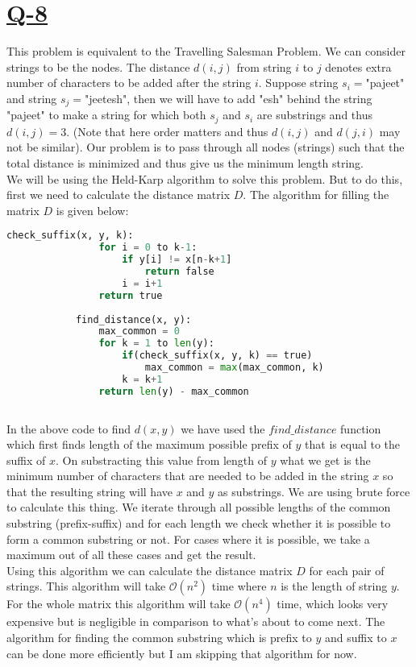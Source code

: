 \documentclass[14pt]{article}
\begin{document}
	\section*{\underline{Q-8}}
		\noindent
		This problem is equivalent to the Travelling Salesman Problem. We can consider strings to be the nodes. The distance $d(i, j)$ from string $i$ to $j$ denotes extra number of characters to be added after the string $i$. Suppose string $s_i = $"pajeet" and string $s_j = $"jeetesh", then we will have to add "esh" behind the string "pajeet" to make a string for which both $s_j$ and $s_i$ are substrings and thus $d(i, j) = 3$. (Note that here order matters and thus $d(i, j)$ and $d(j, i)$ may not be similar). Our problem is to pass through all nodes (strings) such that the total distance is minimized and thus give us the minimum length string.\\
		\newline
		We will be using the Held-Karp algorithm to solve this problem. But to do this, first we need to calculate the distance matrix $D$. The algorithm for filling the matrix $D$ is given below:\\
		\begin{lstlisting}[language=Python]
			check_suffix(x, y, k):
				for i = 0 to k-1:
					if y[i] != x[n-k+1]
						return false
					i = i+1
				return true
			
			find_distance(x, y):
				max_common = 0
				for k = 1 to len(y):
					if(check_suffix(x, y, k) == true)
						max_common = max(max_common, k)
					k = k+1
				return len(y) - max_common
			
		\end{lstlisting}
		In the above code to find $d(x, y)$ we have used the $find\_distance$ function which first finds length of the maximum possible prefix of $y$ that is equal to the suffix of $x$. On substracting this value from length of $y$ what we get is the minimum number of characters that are needed to be added in the string $x$ so that the resulting string will have $x$ and $y$ as substrings. We are using brute force to calculate this thing. We iterate through all possible lengths of the common substring (prefix-suffix) and for each length we check whether it is possible to form a common substring or not. For cases where it is possible, we take a maximum out of all these cases and get the result.\\
		\newline
	    Using this algorithm we can calculate the distance matrix $D$ for each pair of strings. This algorithm will take $\mathcal{O}(n^2)$ time where $n$ is the length of string $y$. For the whole matrix this algorithm will take $\mathcal{O}(n^4)$ time, which looks very expensive but is negligible in comparison to what's about to come next. The algorithm for finding the common substring which is prefix to $y$ and suffix to $x$ can be done more efficiently but I am skipping that algorithm for now.\\
\end{document}
